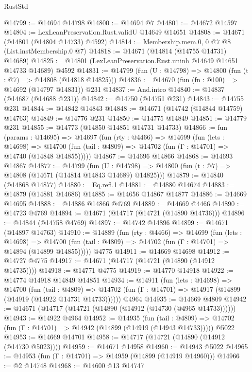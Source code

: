 \begin{lexlean}{RustStd}
\begin{coremodule}
@14799 := @14694 @14798
@14800 := @14694 @7
@14801 := @14672 @14597
@14804 := LexLeanPreservation.Rust.validU @14649 @14651
@14808 := @14671 (@14801 (@14804 @14733) @4592)
@14814 := Membership.mem.{0, 0} @7 @8 (List.instMembership.{0} @7)
@14818 := @14671 (@14814 (@14755 @14731) @14689)
@14825 := @14801 (LexLeanPreservation.Rust.uninh @14649 @14651 @14733 @14689) @4592
@14831 := @14799 (fun (U : @14798) => @14800 (fun (t : @7) => @14808 (@14818 @14825)))
@14836 := @14670 (fun (fn : @100) => @14692 (@14797 @14831)) @231
@14837 := And.intro
@14840 := @14837 (@14687 (@14688 @231))
@14842 := @14750 (@14751 @231)
@14843 := @14755 @231
@14844 := @14842 @14843
@14848 := @14671 (@14742 (@14844 @14759) @14763)
@14849 := @14776 @231
@14850 := @14775 @14849
@14851 := @14779 @231
@14855 := @14773 (@14850 @14851 @14731 @14733)
@14866 := fun (params : @14695) =>
  @14697
    (fun (rty : @4466) =>
    @14699
      (fun (lets : @14698) =>
      @14700 (fun (tail : @4809) => @14702 (fun (Γ : @14701) => @14740 (@14848 @14855)))))
@14867 := @14696 @14866
@14868 := @14693 @14867
@14877 := @14799
    (fun (U : @14798) => @14800 (fun (t : @7) => @14808 (@14671 (@14814 @14843 @14689) @14825)))
@14879 := @14840 (@14868 @14877)
@14880 := Eq.refl.{1}
@14881 := @14880 @14674
@14883 := @14879 (@14881 @14686)
@14885 := @14656 @14867 @14877
@14886 := @14669 @14695
@14888 := @14886 @14866 @4769
@14889 := @14669 @4466
@14890 := @14723 @4769
@14894 := @14671 (@14717 (@14721 (@14890 @14736)))
@14896 := @14844 (@14758 @4769)
@14897 := @14742 @14896
@14899 := @14671 (@14897 @14763)
@14910 := @14889
    (fun (rty : @4466) =>
    @14699
      (fun (lets : @14698) =>
      @14700 (fun (tail : @4809) => @14702 (fun (Γ : @14701) => @14894 (@14899 @14855)))))
    @4775
@14911 := @14669 @14698
@14912 := @14727 @4775
@14917 := @14671 (@14717 (@14721 (@14890 (@14912 @14735))))
@14918 := @14771 @4775
@14919 := @14770 @14918
@14922 := @14774 @14918 @14849 @14851
@14934 := @14911
    (fun (lets : @14698) =>
    @14700
      (fun (tail : @4809) =>
      @14702 (fun (Γ : @14701) => @14917 (@14899 (@14919 (@14922 @14731 @14733))))))
    @4964
@14935 := @14669 @4809
@14942 := @14671 (@14717 (@14721 (@14890 (@14912 (@14730 (@4965 @14733))))))
@14943 := @14922 @4964
@14952 := @14935
    (fun (tail : @4809) => @14702 (fun (Γ : @14701) => @14942 (@14899 (@14919 (@14943 @14733)))))
    @5022
@14953 := @14669 @14701
@14958 := @14717 (@14721 (@14890 (@14912 (@14730 @5023))))
@14959 := @14671 @14958
@14960 := @14943 @5022
@14965 := @14953 (fun (Γ : @14701) => @14959 (@14899 (@14919 @14960)))
@14966 := @2 @14748
@14968 := @14600 @13 @14747

\end{coremodule}
\end{lexlean}
